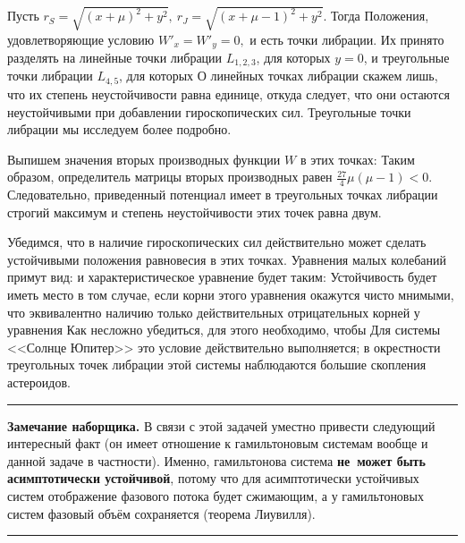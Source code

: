 \documentclass[a4paper,12pt]{article}
\newenvironment{nbb}{\par\vskip3pt\hrule\vskip3pt\textbf{\footnotesize Замечание наборщика.}\footnotesize }
{\vskip3pt\hrule\par\vskip3pt}
\begin{document}
Пусть  $r_S=\sqrt{(x+\mu)^2+y^2},\ r_J=\sqrt{(x+\mu-1)^2+y^2}$. Тогда
 Положения, удовлетворяющие
условию $W'_x=W'_y=0,$ и есть точки либрации. Их принято разделять на линейные точки либрации
$L_{1,2,3}$, для которых $y=0$, и треугольные точки либрации $L_{4,5}$, для которых
 О линейных точках либрации скажем лишь,
что их степень неустойчивости равна единице, откуда следует, что они остаются неустойчивыми при
добавлении гироскопических сил. Треугольные точки либрации мы исследуем более подробно.

Выпишем значения вторых производных функции $W$ в этих точках:
Таким образом, определитель
матрицы вторых производных равен $\frac{27}{4}\mu(\mu-1)<0$. Следовательно, приведенный потенциал
имеет в треугольных точках либрации строгий максимум и степень неустойчивости этих точек равна
двум.

Убедимся, что в наличие гироскопических сил действительно может сделать устойчивыми положения
равновесия в этих точках. Уравнения малых колебаний примут вид:
и характеристическое уравнение будет таким:
Устойчивость будет иметь место в том случае, если корни этого уравнения окажутся чисто мнимыми, что
эквивалентно наличию только действительных отрицательных корней у уравнения
 Как несложно убедиться, для этого необходимо, чтобы
 Для системы <<Солнце Юпитер>> это условие действительно выполняется; в
окрестности треугольных точек либрации этой системы наблюдаются большие скопления астероидов.

\begin{nbb}
В связи с этой задачей уместно привести следующий интересный факт (он имеет отношение
к гамильтоновым системам вообще и данной задаче в частности). Именно, гамильтонова система
\textbf{не~может быть асимптотически устойчивой}, потому что для асимптотически устойчивых систем
отображение фазового потока будет сжимающим, а у гамильтоновых систем фазовый объём сохраняется
(теорема Лиувилля).
\end{nbb}
\end{document}
